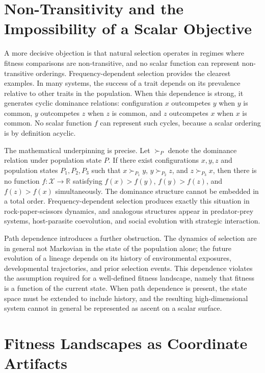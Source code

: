 \documentclass[12pt, a4paper, oneside]{article}
\theoremstyle{plain}
\theoremstyle{definition}
\theoremstyle{remark}
\newcommand{\X}{\mathcal{X}}
\begin{document}
\section{Non-Transitivity and the Impossibility of a Scalar Objective}

A more decisive objection is that natural selection operates in regimes where fitness comparisons are non-transitive, and no scalar function can represent non-transitive orderings. Frequency-dependent selection provides the clearest examples. In many systems, the success of a trait depends on its prevalence relative to other traits in the population. When this dependence is strong, it generates cyclic dominance relations: configuration $x$ outcompetes $y$ when $y$ is common, $y$ outcompetes $z$ when $z$ is common, and $z$ outcompetes $x$ when $x$ is common. No scalar function $f$ can represent such cycles, because a scalar ordering is by definition acyclic.

The mathematical underpinning is precise. Let $\succ_P$ denote the dominance relation under population state $P$. If there exist configurations $x, y, z$ and population states $P_1, P_2, P_3$ such that $x \succ_{P_1} y$, $y \succ_{P_2} z$, and $z \succ_{P_3} x$, then there is no function $f : \X \to \mathbb{R}$ satisfying $f(x) > f(y)$, $f(y) > f(z)$, and $f(z) > f(x)$ simultaneously. The dominance structure cannot be embedded in a total order. Frequency-dependent selection produces exactly this situation in rock-paper-scissors dynamics, and analogous structures appear in predator-prey systems, host-parasite coevolution, and social evolution with strategic interaction.

Path dependence introduces a further obstruction. The dynamics of selection are in general not Markovian in the state of the population alone; the future evolution of a lineage depends on its history of environmental exposures, developmental trajectories, and prior selection events. This dependence violates the assumption required for a well-defined fitness landscape, namely that fitness is a function of the current state. When path dependence is present, the state space must be extended to include history, and the resulting high-dimensional system cannot in general be represented as ascent on a scalar surface.

\section{Fitness Landscapes as Coordinate Artifacts}
\end{document}
